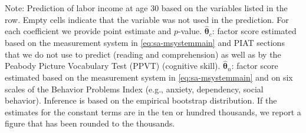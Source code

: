 \documentclass[static]{JJH-Beamer}
\begin{document}
\begin{frame}
\begin{table}[H]
\begin{center}
\end{center}
\tiny \flushleft
Note: Prediction of labor income at age 30 based on the variables listed in the row. Empty cells indicate that the variable was not used in the prediction. For each coefficient we provide point estimate and $p$-value. $\hat{\bm{\theta}}_{c}$: factor score estimated based on the measurement system in \eqref{eq:sa-msystemmain} and PIAT sections that we do not use to predict (reading and comprehension) as well as by the Peabody Picture Vocabulary Test (PPVT) (cognitive skill). $\hat{\bm{\theta}}_{n}$: factor score estimated based on the measurement system in \eqref{eq:sa-msystemmain} and on six scales of the Behavior Problems Index (e.g., anxiety, dependency, social behavior). Inference is based on the empirical bootstrap distribution. If the estimates for the constant terms are in the ten or hundred thousands, we report a figure that has been rounded to the thousands.\\
\end{table}

\end{frame}
\end{document}
